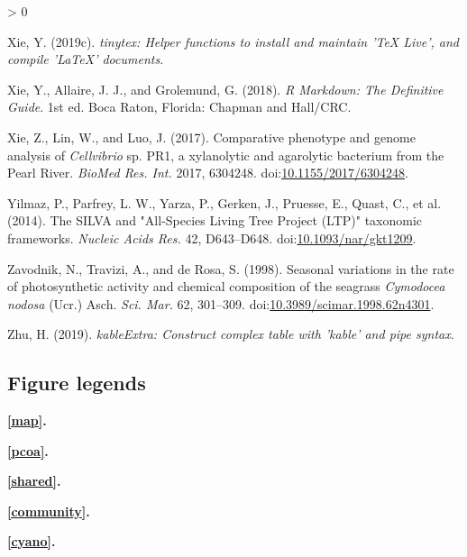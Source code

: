 \documentclass[
  12pt,
]{article}
\newlength{\cslhangindent}
\newenvironment{CSLReferences}[2] %
 {%
  \setlength{\parindent}{0pt}
  \ifodd #1 \everypar{\setlength{\hangindent}{\cslhangindent}}\ignorespaces\fi
  \ifnum #2 > 0
  \setlength{\parskip}{#2\baselineskip}
  \fi
 }%
 {}
\begin{document}
\begin{CSLReferences}{1}{0}
\leavevmode\hypertarget{ref-Xie2019b}{}%
Xie, Y. (2019c). \emph{{tinytex}: Helper functions to install and
maintain '{TeX Live}', and compile '{LaTeX}' documents}.

\leavevmode\hypertarget{ref-Xie2018}{}%
Xie, Y., Allaire, J. J., and Grolemund, G. (2018). \emph{R {Markdown}:
{The Definitive Guide}}. 1st ed. {Boca Raton, Florida}: {Chapman and
Hall/CRC}.

\leavevmode\hypertarget{ref-Xie2017}{}%
Xie, Z., Lin, W., and Luo, J. (2017). Comparative phenotype and genome
analysis of {\emph{Cellvibrio}} sp. {PR1}, a xylanolytic and agarolytic
bacterium from the {Pearl River}. \emph{BioMed Res. Int.} 2017, 6304248.
doi:\href{https://doi.org/10.1155/2017/6304248}{10.1155/2017/6304248}.

\leavevmode\hypertarget{ref-Yilmaz2014}{}%
Yilmaz, P., Parfrey, L. W., Yarza, P., Gerken, J., Pruesse, E., Quast,
C., et al. (2014). The {SILVA} and "{All}-{Species Living Tree Project}
({LTP})" taxonomic frameworks. \emph{Nucleic Acids Res.} 42, D643--D648.
doi:\href{https://doi.org/10.1093/nar/gkt1209}{10.1093/nar/gkt1209}.

\leavevmode\hypertarget{ref-Zavodnik1998}{}%
Zavodnik, N., Travizi, A., and de Rosa, S. (1998). Seasonal variations
in the rate of photosynthetic activity and chemical composition of the
seagrass {\emph{Cymodocea nodosa}} ({Ucr}.) {Asch}. \emph{Sci. Mar.} 62,
301--309.
doi:\href{https://doi.org/10.3989/scimar.1998.62n4301}{10.3989/scimar.1998.62n4301}.

\leavevmode\hypertarget{ref-Zhu2019}{}%
Zhu, H. (2019). \emph{{kableExtra}: Construct complex table with 'kable'
and pipe syntax}.

\end{CSLReferences}

\newpage 
\setlength\parindent{0pt}

\hypertarget{figure-legends}{%
\subsection{Figure legends}\label{figure-legends}}

\textbf{\autoref{map}.} 

\textbf{\autoref{pcoa}.} 

\textbf{\autoref{shared}.} 

\textbf{\autoref{community}.} 

\textbf{\autoref{cyano}.} 
\end{document}
